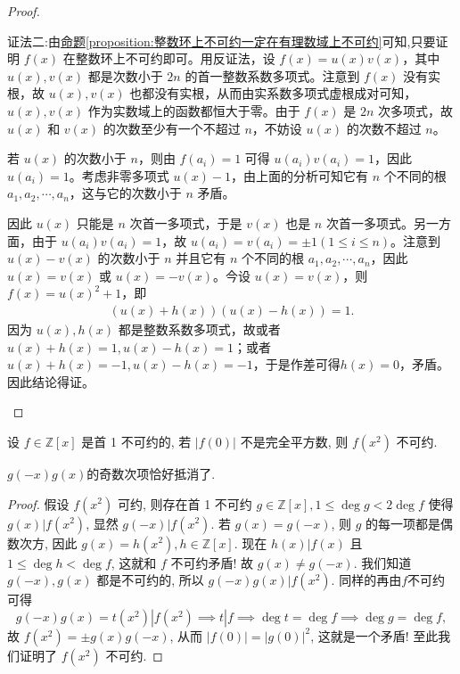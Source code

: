 \documentclass[../../main.tex]{subfiles}%
\begin{document}
\begin{proof}
\begin{enumerate}
{\color{blue}证法二:}由\hyperref[proposition:整数环上不可约一定在有理数域上不可约]{命题\ref{proposition:整数环上不可约一定在有理数域上不可约}}可知,只要证明 $f(x)$ 在整数环上不可约即可。用反证法，设 $f(x) = u(x)v(x)$，其中 $u(x), v(x)$ 都是次数小于 $2n$ 的首一整数系数多项式。注意到 $f(x)$ 没有实根，故
$u(x), v(x)$
也都没有实根，从而由实系数多项式虚根成对可知，$u(x), v(x)$ 作为实数域上的函数都恒大于零。由于 $f(x)$ 是 $2n$ 次多项式，故 $u(x)$ 和 $v(x)$ 的次数至少有一个不超过 $n$，不妨设 $u(x)$ 的次数不超过 $n$。

若 $u(x)$ 的次数小于 $n$，则由 $f(a_i) = 1$ 可得 $u(a_i)v(a_i) = 1$，因此 $u(a_i) = 1$。考虑非零多项式 $u(x) - 1$，由上面的分析可知它有 $n$ 个不同的根 $a_1, a_2, \cdots, a_n$，这与它的次数小于 $n$ 矛盾。

因此 $u(x)$ 只能是 $n$ 次首一多项式，于是 $v(x)$ 也是 $n$ 次首一多项式。另一方面，由于 $u(a_i)v(a_i) = 1$，故 $u(a_i) = v(a_i) = \pm 1 (1 \leqslant  i \leqslant  n)$。注意到 $u(x) - v(x)$ 的次数小于 $n$ 并且它有 $n$ 个不同的根 $a_1, a_2, \cdots, a_n$，因此 $u(x) = v(x)$ 或 $u(x) = -v(x)$。今设 $u(x) = v(x)$，则 $f(x) = u(x)^2 + 1$，即
\begin{align*}
(u(x) + h(x))(u(x) - h(x)) = 1.
\end{align*}
因为 $u(x), h(x)$ 都是整数系数多项式，故或者 $u(x) + h(x) = 1, u(x) - h(x) = 1$；或者 $u(x) + h(x) = -1, u(x) - h(x) = -1$，于是作差可得$h(x) = 0$，矛盾。因此结论得证。
\end{enumerate}
\end{proof}

\begin{example}\label{example:不可约多项式证明例题11}
设 \( f \in \mathbb{Z}[x] \) 是首 1 不可约的, 若 \( |f(0)| \) 不是完全平方数, 则 \( f(x^2) \) 不可约.
\end{example}
\begin{remark}
$g(-x)g(x)$的奇数次项恰好抵消了.
\end{remark}
\begin{proof}
假设 \( f(x^2) \) 可约, 则存在首 1 不可约 \( g \in \mathbb{Z}[x], 1 \leqslant \deg g < 2\deg f \) 使得 \( g(x)|f(x^2) \), 显然 \( g(-x)|f(x^2) \). 若 \( g(x) = g(-x) \), 则 \( g \) 的每一项都是偶数次方, 因此 \( g(x) = h(x^2), h \in \mathbb{Z}[x] \). 现在 \( h(x)|f(x) \) 且 \( 1 \leqslant \deg h < \deg f \), 这就和 \( f \) 不可约矛盾! 故 \( g(x) \neq g(-x) \). 我们知道 \( g(-x), g(x) \) 都是不可约的, 所以 \( g(-x)g(x)|f(x^2) \). 同样的再由$f$不可约可得
\[
g(-x)g(x) = t(x^2)|f(x^2) \implies t|f \implies \deg t = \deg f \implies \deg g = \deg f,
\]
故 \( f(x^2) = \pm g(x)g(-x) \), 从而 \( |f(0)| = |g(0)|^2 \), 这就是一个矛盾! 至此我们证明了 \( f(x^2) \) 不可约.
\end{proof}
\end{document}
